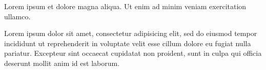 \documentclass{article}
\begin{document}
Lorem ipsum  et dolore magna aliqua. Ut enim
ad minim veniam exercitation ullamco.

Lorem ipsum dolor sit amet, consectetur adipisicing elit, sed do eiusmod
tempor incididunt ut  reprehenderit in
voluptate velit esse cillum dolore eu fugiat nulla pariatur. Excepteur
sint occaecat cupidatat non proident, sunt in culpa qui officia deserunt
mollit anim id est laborum.
\end{document}
